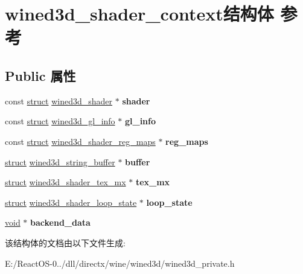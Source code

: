 \hypertarget{structwined3d__shader__context}{}\section{wined3d\+\_\+shader\+\_\+context结构体 参考}
\label{structwined3d__shader__context}
\subsection*{Public 属性}
\begin{DoxyCompactItemize}
\item 
\mbox{\label{structwined3d__shader__context_a4a5f7fbd6ee4560391c039fa65608a96}} 
const \hyperlink{interfacestruct}{struct} \hyperlink{structwined3d__shader}{wined3d\+\_\+shader} $\ast$ {\bfseries shader}
\item 
\mbox{\label{structwined3d__shader__context_acbf738ca783759f1e96c60c9cb296b83}} 
const \hyperlink{interfacestruct}{struct} \hyperlink{structwined3d__gl__info}{wined3d\+\_\+gl\+\_\+info} $\ast$ {\bfseries gl\+\_\+info}
\item 
\mbox{\label{structwined3d__shader__context_a403424d8514613c385f2b3a21aa8ef2d}} 
const \hyperlink{interfacestruct}{struct} \hyperlink{structwined3d__shader__reg__maps}{wined3d\+\_\+shader\+\_\+reg\+\_\+maps} $\ast$ {\bfseries reg\+\_\+maps}
\item 
\mbox{\label{structwined3d__shader__context_a96b07a2843417c7c9f68fdbdba1fb301}} 
\hyperlink{interfacestruct}{struct} \hyperlink{structwined3d__string__buffer}{wined3d\+\_\+string\+\_\+buffer} $\ast$ {\bfseries buffer}
\item 
\mbox{\label{structwined3d__shader__context_aef6f81c47e2b2e646c2d403bf7e2f8e0}} 
\hyperlink{interfacestruct}{struct} \hyperlink{structwined3d__shader__tex__mx}{wined3d\+\_\+shader\+\_\+tex\+\_\+mx} $\ast$ {\bfseries tex\+\_\+mx}
\item 
\mbox{\label{structwined3d__shader__context_a004e6020b3b489049729679e4e724955}} 
\hyperlink{interfacestruct}{struct} \hyperlink{structwined3d__shader__loop__state}{wined3d\+\_\+shader\+\_\+loop\+\_\+state} $\ast$ {\bfseries loop\+\_\+state}
\item 
\mbox{\label{structwined3d__shader__context_a0bd8b02f2cb56dafc431f701886db415}} 
\hyperlink{interfacevoid}{void} $\ast$ {\bfseries backend\+\_\+data}
\end{DoxyCompactItemize}


该结构体的文档由以下文件生成\+:\begin{DoxyCompactItemize}
\item 
E\+:/\+React\+O\+S-\/0../dll/directx/wine/wined3d/wined3d\+\_\+private.\+h\end{DoxyCompactItemize}
